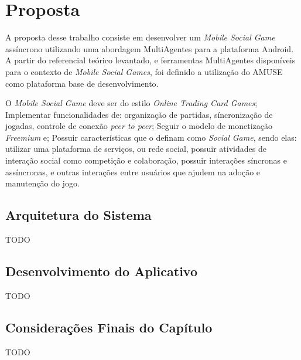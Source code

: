 \chapter[Proposta]{Proposta}

A proposta desse trabalho consiste em desenvolver um \textit{Mobile Social Game} assíncrono utilizando uma abordagem MultiAgentes para a plataforma Android. A partir do referencial teórico levantado, e ferramentas MultiAgentes disponíveis para o contexto de \textit{Mobile Social Games}, foi definido a utilização do AMUSE como plataforma base de desenvolvimento.

O \textit{Mobile Social Game} deve ser do estilo \textit{Online Trading Card Games}; Implementar funcionalidades de: organização de partidas, síncronização de jogadas, controle de conexão \textit{peer to peer}; Seguir o modelo de monetização \textit{Freemium} e; Possuir características que o definam como \textit{Social Game}, sendo elas: utilizar uma plataforma de serviços, ou rede social, possuir atividades de interação social como competição e colaboração, possuir interações síncronas e assíncronas, e outras interações entre usuários que ajudem na adoção e manutenção do jogo.




\section{Arquitetura do Sistema}

TODO


\section{Desenvolvimento do Aplicativo}

TODO


\section{Considerações Finais do Capítulo}

TODO
